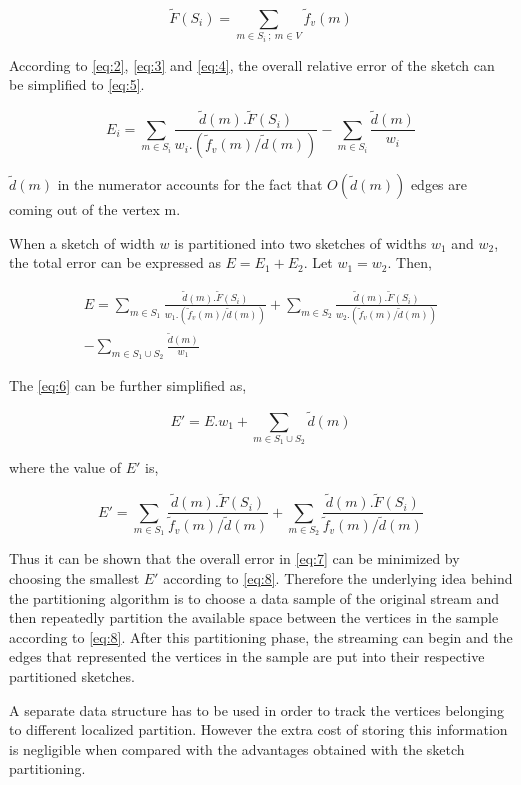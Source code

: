 \begin{equation}
    \tilde{F}(S_i) = \sum_{m \in S_i \: ; \: m \in V}^{} \tilde{f}_v(m)
    \label{eq:4}
\end{equation}

According to \eqref{eq:2}, \eqref{eq:3} and \eqref{eq:4}, the overall relative error of the sketch can be simplified to \eqref{eq:5}.

\begin{equation}
    E_i = \sum_{m \in S_i}^{} \frac{\tilde{d}(m) . \tilde{F}(S_i)}{w_i . (\tilde{f}_v(m) / \tilde{d}(m))} - \sum_{m \in S_i}^{} \frac{\tilde{d}(m)}{w_i}
    \label{eq:5}
\end{equation}

\(\tilde{d}(m)\) in the numerator accounts for the fact that \(O(\tilde{d}(m))\) edges are coming out of the vertex m.

When a sketch of width \(w\) is partitioned into two sketches of widths \(w_1\) and \(w_2\), the total error can be expressed as \(E = E_1 + E_2\). Let \(w_1 = w_2\). Then,

\begin{multline}
    E = \sum_{m \in S_1}^{} \frac{\tilde{d}(m) . \tilde{F}(S_i)}{w_1 . (\tilde{f}_v(m) / \tilde{d}(m))} + \sum_{m \in S_2}^{} \frac{\tilde{d}(m) . \tilde{F}(S_i)}{w_2 . (\tilde{f}_v(m) / \tilde{d}(m))}\\ - \sum_{m \in S_1 \cup S_2}^{} \frac{\tilde{d}(m)}{w_1}
    \label{eq:6}
\end{multline}

The \eqref{eq:6} can be further simplified as,

\begin{equation}
    E' = E . w_1 + \sum_{m \in S_1 \cup S_2}^{} \tilde{d}(m)
    \label{eq:7}
\end{equation}

where the value of \(E'\) is,

\begin{equation}
    E' = \sum_{m \in S_1}^{} \frac{\tilde{d}(m) . \tilde{F}(S_i)}{\tilde{f}_v(m) / \tilde{d}(m)} + \sum_{m \in S_2}^{} \frac{\tilde{d}(m) . \tilde{F}(S_i)}{\tilde{f}_v(m) / \tilde{d}(m)}
    \label{eq:8}
\end{equation}

Thus it can be shown that the overall error in \eqref{eq:7} can be minimized by choosing the smallest \(E'\) according to \eqref{eq:8}. Therefore the underlying idea behind the partitioning algorithm is to choose a data sample of the original stream and then repeatedly partition the available space between the vertices in the sample according to \eqref{eq:8}. After this partitioning phase, the streaming can begin and the edges that represented the vertices in the sample are put into their respective partitioned sketches.

A separate data structure has to be used in order to track the vertices belonging to different localized partition. However the extra cost of storing this information is negligible when compared with the advantages obtained with the sketch partitioning.